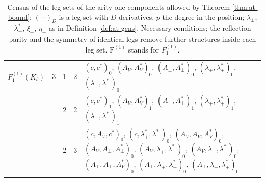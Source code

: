 {\begin{longtable}{>{\raggedright}p{2.3cm}|p{0.6cm}|p{0.25cm}|p{0.25cm}|>{\raggedright\arraybackslash}p{11.6cm}}
\hline
$F_1^{(1)}(K_b)$ & $3$ & 1 & 2 & $(c,c^*)_{0}$, $(A_V,A^*_V)_{0}$, $(A_\perp,A^*_\perp)_{0}$, $(\lambda_+,\lambda^*_+)_{0}$, $(\lambda_-,\lambda^*_-)_{0}$ \\
 &  & 2 & 2 & $(c,c^*)_{1}$, $(A_V,A^*_V)_{1}$, $(A_\perp,A^*_\perp)_{1}$, $(\lambda_+,\lambda^*_+)_{1}$, $(\lambda_-,\lambda^*_-)_{1}$ \\
 &  & 2 & 3 & $(c,A_V,c^*)_{0}$, $(c,\lambda^*_+,\lambda^*_-)_{0}$, $(A_V,A_V,A^*_V)_{0}$, $(A_V,A_\perp,A^*_\perp)_{0}$, $(A_V,\lambda_+,\lambda^*_+)_{0}$, $(A_V,\lambda_-,\lambda^*_-)_{0}$, $(A_\perp,A_\perp,A^*_V)_{0}$, $(A_\perp,\lambda_+,\lambda^*_-)_{0}$, $(A_\perp,\lambda_-,\lambda^*_+)_{0}$ \\
\hline

\caption{Census of the leg sets of the arity-one components allowed by Theorem \ref{thm:at-bound}: $(\cdots)_D$ is a leg set with $D$ derivatives, $p$ the degree in the position; $\lambda_\pm$, $\lambda^*_\pm$, $\xi_\pm$, $\eta_\pm$ as in Definition \ref{def:at-gens}. Necessary conditions; the reflection parity and the symmetry of identical legs remove further structures inside each leg set. $\mathrm{F}^{(1)}$ stands for $F_1^{(1)}$.}
\label{tab:at-census1}
\end{longtable}

}
